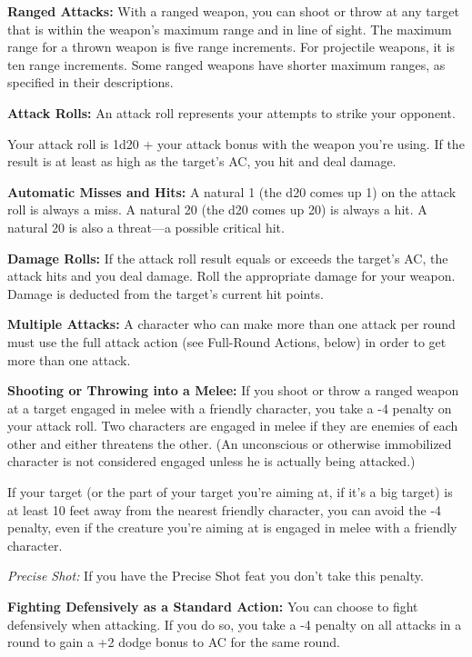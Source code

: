 \documentclass{article}
\begin{document}
\textbf{Ranged Attacks:} With a ranged weapon, you can shoot or throw at any target 
that is within the weapon's maximum range and in line of sight. The maximum range 
for a thrown weapon is five range increments. For projectile weapons, it is ten 
range increments. Some ranged weapons have shorter maximum ranges, as specified 
in their descriptions.

\textbf{Attack Rolls:} An attack roll represents your attempts to strike your opponent. 

Your attack roll is 1d20 + your attack bonus with the weapon you're using. If the 
result is at least as high as the target's AC, you hit and deal damage.

\textbf{Automatic Misses and Hits:} A natural 1 (the d20 comes up 1) on the attack 
roll is always a miss. A natural 20 (the d20 comes up 20) is always a hit. A natural 
20 is also a threat---a possible critical hit.

\textbf{Damage Rolls:} If the attack roll result equals or exceeds the target's 
AC, the attack hits and you deal damage. Roll the appropriate damage for your weapon. 
Damage is deducted from the target's current hit points.

\textbf{Multiple Attacks:} A character who can make more than one attack per round 
must use the full attack action (see Full-Round Actions, below) in order to get 
more than one attack.

\textbf{Shooting or Throwing into a Melee:} If you shoot or throw a ranged weapon 
at a target engaged in melee with a friendly character, you take a -4 penalty on 
your attack roll. Two characters are engaged in melee if they are enemies of each 
other and either threatens the other. (An unconscious or otherwise immobilized 
character is not considered engaged unless he is actually being attacked.)

If your target (or the part of your target you're aiming at, if it's a big target) 
is at least 10 feet away from the nearest friendly character, you can avoid the 
-4 penalty, even if the creature you're aiming at is engaged in melee with a friendly 
character.

\textit{Precise Shot: }If you have the Precise Shot feat you don't take this penalty.

\textbf{Fighting Defensively as a Standard Action:} You can choose to fight defensively 
when attacking. If you do so, you take a -4 penalty on all attacks in a round to 
gain a +2 dodge bonus to AC for the same round.
\end{document}
